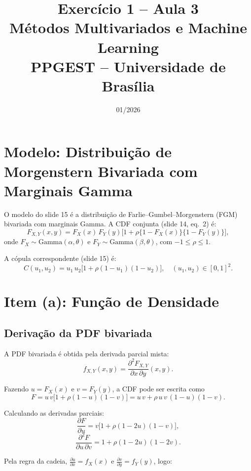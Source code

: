 \documentclass[12pt,a4paper]{article}
\title{\textbf{Exercício 1 -- Aula 3}\\
\large Métodos Multivariados e Machine Learning\\
PPGEST -- Universidade de Brasília}
\author{}
\date{01/2026}
\begin{document}
\maketitle

\section*{Modelo: Distribuição de Morgenstern Bivariada com Marginais Gamma}

O modelo do slide 15 é a distribuição de Farlie--Gumbel--Morgenstern (FGM) bivariada com marginais Gamma.
A CDF conjunta (slide 14, eq.\ 2) é:
\begin{equation}\label{eq:cdf}
F_{X,Y}(x,y) = F_X(x)\,F_Y(y)\big[1 + \rho\{1 - F_X(x)\}\{1 - F_Y(y)\}\big],
\end{equation}
onde $F_X \sim \text{Gamma}(\alpha,\theta)$ e $F_Y \sim \text{Gamma}(\beta,\theta)$, com $-1 \leqslant \rho \leqslant 1$.

A cópula correspondente (slide 15) é:
\begin{equation}\label{eq:copula}
C(u_1, u_2) = u_1\,u_2\big[1 + \rho(1 - u_1)(1 - u_2)\big], \quad (u_1, u_2) \in [0,1]^2.
\end{equation}

\section{Item (a): Função de Densidade}

\subsection{Derivação da PDF bivariada}

A PDF bivariada é obtida pela derivada parcial mista:
\[
f_{X,Y}(x,y) = \frac{\partial^2 F_{X,Y}}{\partial x\, \partial y}(x,y).
\]

Fazendo $u = F_X(x)$ e $v = F_Y(y)$, a CDF pode ser escrita como
\[
F = u\,v\big[1 + \rho(1-u)(1-v)\big] = u\,v + \rho\,u\,v\,(1-u)(1-v).
\]

Calculando as derivadas parciais:
\[
\frac{\partial F}{\partial u} = v\big[1 + \rho(1-2u)(1-v)\big],
\]
\[
\frac{\partial^2 F}{\partial u\,\partial v} = 1 + \rho(1-2u)(1-2v).
\]

Pela regra da cadeia, $\frac{\partial u}{\partial x} = f_X(x)$ e $\frac{\partial v}{\partial y} = f_Y(y)$, logo:
\end{document}

